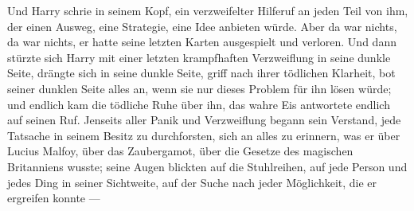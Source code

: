 Und Harry schrie in seinem Kopf, ein verzweifelter Hilferuf an jeden Teil von ihm, der einen Ausweg, eine Strategie, eine Idee anbieten würde. Aber da war nichts, da war nichts, er hatte seine letzten Karten ausgespielt und verloren. Und dann stürzte sich Harry mit einer letzten krampfhaften Verzweiflung in seine dunkle Seite, drängte sich in seine dunkle Seite, griff nach ihrer tödlichen Klarheit, bot seiner dunklen Seite alles an, wenn sie nur dieses Problem für ihn lösen würde; und endlich kam die tödliche Ruhe über ihn, das wahre Eis antwortete endlich auf seinen Ruf. Jenseits aller Panik und Verzweiflung begann sein Verstand, jede Tatsache in seinem Besitz zu durchforsten, sich an alles zu erinnern, was er über Lucius Malfoy, über das Zaubergamot, über die Gesetze des magischen Britanniens wusste; seine Augen blickten auf die Stuhlreihen, auf jede Person und jedes Ding in seiner Sichtweite, auf der Suche nach jeder Möglichkeit, die er ergreifen konnte —

